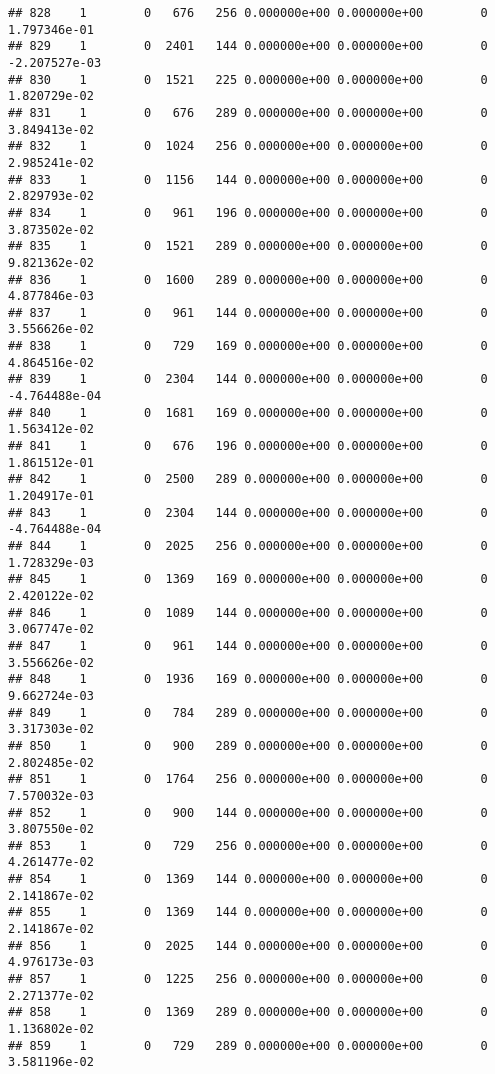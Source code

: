 \documentclass[
]{article}
\begin{document}
\begin{enumerate}
\begin{verbatim}
## 828    1        0   676   256 0.000000e+00 0.000000e+00        0  1.797346e-01
## 829    1        0  2401   144 0.000000e+00 0.000000e+00        0 -2.207527e-03
## 830    1        0  1521   225 0.000000e+00 0.000000e+00        0  1.820729e-02
## 831    1        0   676   289 0.000000e+00 0.000000e+00        0  3.849413e-02
## 832    1        0  1024   256 0.000000e+00 0.000000e+00        0  2.985241e-02
## 833    1        0  1156   144 0.000000e+00 0.000000e+00        0  2.829793e-02
## 834    1        0   961   196 0.000000e+00 0.000000e+00        0  3.873502e-02
## 835    1        0  1521   289 0.000000e+00 0.000000e+00        0  9.821362e-02
## 836    1        0  1600   289 0.000000e+00 0.000000e+00        0  4.877846e-03
## 837    1        0   961   144 0.000000e+00 0.000000e+00        0  3.556626e-02
## 838    1        0   729   169 0.000000e+00 0.000000e+00        0  4.864516e-02
## 839    1        0  2304   144 0.000000e+00 0.000000e+00        0 -4.764488e-04
## 840    1        0  1681   169 0.000000e+00 0.000000e+00        0  1.563412e-02
## 841    1        0   676   196 0.000000e+00 0.000000e+00        0  1.861512e-01
## 842    1        0  2500   289 0.000000e+00 0.000000e+00        0  1.204917e-01
## 843    1        0  2304   144 0.000000e+00 0.000000e+00        0 -4.764488e-04
## 844    1        0  2025   256 0.000000e+00 0.000000e+00        0  1.728329e-03
## 845    1        0  1369   169 0.000000e+00 0.000000e+00        0  2.420122e-02
## 846    1        0  1089   144 0.000000e+00 0.000000e+00        0  3.067747e-02
## 847    1        0   961   144 0.000000e+00 0.000000e+00        0  3.556626e-02
## 848    1        0  1936   169 0.000000e+00 0.000000e+00        0  9.662724e-03
## 849    1        0   784   289 0.000000e+00 0.000000e+00        0  3.317303e-02
## 850    1        0   900   289 0.000000e+00 0.000000e+00        0  2.802485e-02
## 851    1        0  1764   256 0.000000e+00 0.000000e+00        0  7.570032e-03
## 852    1        0   900   144 0.000000e+00 0.000000e+00        0  3.807550e-02
## 853    1        0   729   256 0.000000e+00 0.000000e+00        0  4.261477e-02
## 854    1        0  1369   144 0.000000e+00 0.000000e+00        0  2.141867e-02
## 855    1        0  1369   144 0.000000e+00 0.000000e+00        0  2.141867e-02
## 856    1        0  2025   144 0.000000e+00 0.000000e+00        0  4.976173e-03
## 857    1        0  1225   256 0.000000e+00 0.000000e+00        0  2.271377e-02
## 858    1        0  1369   289 0.000000e+00 0.000000e+00        0  1.136802e-02
## 859    1        0   729   289 0.000000e+00 0.000000e+00        0  3.581196e-02

\end{verbatim}
\end{enumerate}
\end{document}
